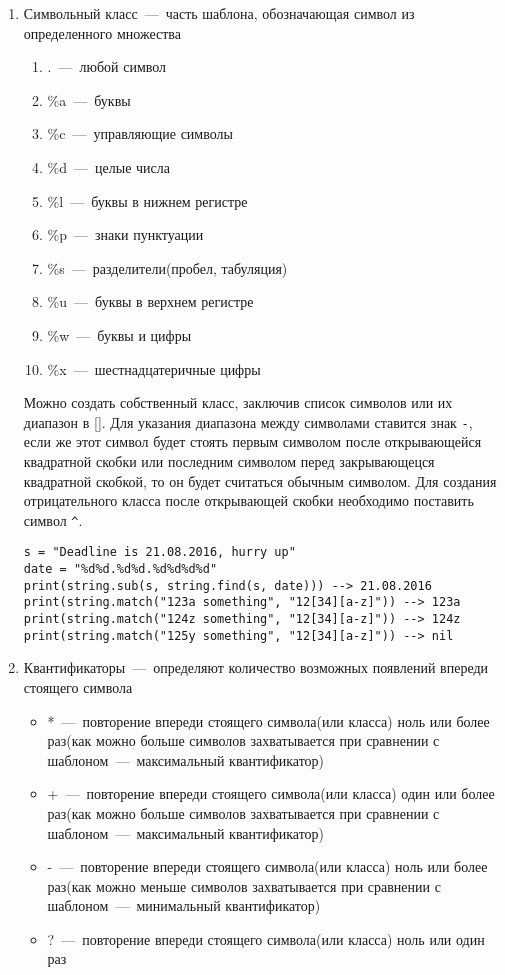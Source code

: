\begin{enumerate}
	\item Символьный класс~---~часть шаблона, обозначающая символ из определенного множества
	
	\begin{enumerate}
	 \item .~---~любой символ
	 \item \%a~---~буквы
	 \item \%c~---~управляющие символы
	 \item \%d~---~целые числа
	 \item \%l~---~буквы в нижнем регистре
	 \item \%p~---~знаки пунктуации
	 \item \%s~---~разделители(пробел, табуляция)
	 \item \%u~---~буквы в верхнем регистре
	 \item \%w~---~буквы и цифры
	 \item \%x~---~шестнадцатеричные цифры
	\end{enumerate}
	
	Можно создать собственный класс, заключив список символов или их диапазон в []. Для указания диапазона между символами ставится знак \lstinline{-}, если же этот символ будет стоять первым символом после открывающейся квадратной скобки или последним символом перед закрывающецся квадратной скобкой, то он будет считаться обычным символом. Для создания отрицательного класса после открывающей скобки необходимо поставить символ \lstinline{^}. 
	
\begin{lstlisting}
s = "Deadline is 21.08.2016, hurry up"
date = "%d%d.%d%d.%d%d%d%d"
print(string.sub(s, string.find(s, date))) --> 21.08.2016
print(string.match("123a something", "12[34][a-z]")) --> 123a
print(string.match("124z something", "12[34][a-z]")) --> 124z
print(string.match("125y something", "12[34][a-z]")) --> nil
\end{lstlisting}
	
	\item Квантификаторы~---~определяют количество возможных появлений впереди стоящего символа
	\begin{itemize}
		\item *~---~повторение впереди стоящего символа(или класса) ноль или более раз(как можно больше символов захватывается при сравнении с шаблоном~---~максимальный квантификатор)
		\item +~---~повторение впереди стоящего символа(или класса) один или более раз(как можно больше символов захватывается при сравнении с шаблоном~---~максимальный квантификатор)
		\item -~---~повторение впереди стоящего символа(или класса) ноль или более раз(как можно меньше символов захватывается при сравнении с шаблоном~---~минимальный квантификатор)
		\item ?~---~повторение впереди стоящего символа(или класса) ноль или один раз
	\end{itemize}
	

\end{enumerate}
